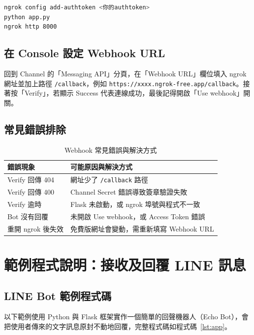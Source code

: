 \documentclass[12pt,a4paper]{report}
\begin{document}
\begin{lstlisting}[language=bash, caption={ngrok 啟動指令}, label={lst:ngrok}]
ngrok config add-authtoken <你的authtoken>
python app.py
ngrok http 8000
\end{lstlisting}

\section{在 Console 設定 Webhook URL}
回到 Channel 的「Messaging API」分頁，在「Webhook URL」欄位填入 ngrok 網址並加上路徑 \texttt{/callback}，例如 \texttt{https://xxxx.ngrok-free.app/callback}。接著按「Verify」，若顯示 Success 代表連線成功，最後記得開啟「Use webhook」開關。

\section{常見錯誤排除}
\begin{table}[htbp]
  \centering
  \caption{Webhook 常見錯誤與解決方式}
  \label{tab:error}
  \begin{tabularx}{0.95\textwidth}{lX}
    \toprule
    \textbf{錯誤現象} & \textbf{可能原因與解決方式} \\
    \midrule
    Verify 回傳 404 & 網址少了 \texttt{/callback} 路徑 \\
    Verify 回傳 400 & Channel Secret 錯誤導致簽章驗證失敗 \\
    Verify 逾時 & Flask 未啟動，或 ngrok 埠號與程式不一致 \\
    Bot 沒有回覆 & 未開啟 Use webhook，或 Access Token 錯誤 \\
    重開 ngrok 後失效 & 免費版網址會變動，需重新填寫 Webhook URL \\
    \bottomrule
  \end{tabularx}
\end{table}

\chapter{範例程式說明：接收及回覆 LINE 訊息}

\section{LINE Bot 範例程式碼}
以下範例使用 Python 與 Flask 框架實作一個簡單的回聲機器人（Echo Bot），會把使用者傳來的文字訊息原封不動地回覆，完整程式碼如程式碼~\ref{lst:app}。
\end{document}
